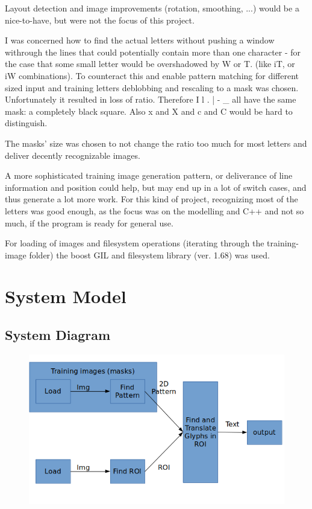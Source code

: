 \documentclass[12pt]{scrartcl}
\begin{document}
Layout detection and image improvements (rotation, smoothing, ...) would be a nice-to-have, but were not the focus of this project.

I was concerned how to find the actual letters without pushing a window withrough the lines that could potentially contain more than one character - for the case that some small letter would be overshadowed by W or T. (like iT, or iW combinations). To counteract this and enable pattern matching for different sized input and training letters deblobbing and rescaling to a mask was chosen.
Unfortunately it resulted in loss of ratio. Therefore I l . | - \_ all have the same mask: a completely black square. Also x and X and c and C would be hard to distinguish.\newline

The masks' size was chosen to not change the ratio too much for most letters and deliver decently recognizable images. 

A more sophisticated training image generation pattern, or deliverance of line information and position could help, but may end up in a lot of switch cases, and thus generate a lot more work. For this kind of project, recognizing most of the letters was good enough, as the focus was on the modelling and C++ and not so much, if the program is ready for general use.

For loading of images and filesystem operations (iterating through the training-image folder) the boost GIL and filesystem library (ver. 1.68) was used.


\section {System Model}
  \subsection{System Diagram}
\begin{figure}[h]
\centering
\includegraphics[width=\textwidth,keepaspectratio]{./systemdiagramm.png}
\end{figure}
\newpage
\end{document}
